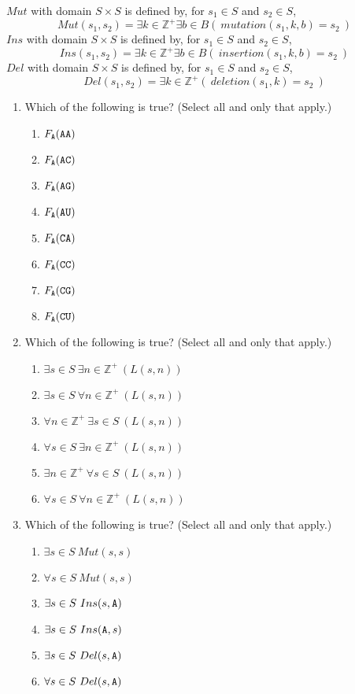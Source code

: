 \documentclass[12pt, oneside]{article}
\begin{document}
\begin{enumerate}
$Mut$ with domain $S \times S$ is defined by, for $s_1 \in S$ and $s_2 \in S$,
\[
Mut(s_1,s_2) = \exists k\in \mathbb{Z^+} \exists b \in B (~ mutation(s_1, k, b) = s_2~)
\]
$Ins$ with domain $S \times S$ is defined by, for $s_1 \in S$ and $s_2 \in S$,
\[
Ins(s_1,s_2) = \exists k\in \mathbb{Z^+} \exists b \in B (~ insertion(s_1, k, b) = s_2~)
\]
$Del$ with domain $S \times S$ is defined by, for $s_1 \in S$ and $s_2 \in S$,
\[
Del(s_1,s_2) = \exists k\in \mathbb{Z^+} (~ deletion(s_1, k) = s_2~)
\]

\begin{enumerate}
\item Which of the following is true? (Select  all and only that apply.)
 \begin{enumerate}
    \item $F_{\texttt{A}} ( \texttt{A}\texttt{A})$
    \item $F_{\texttt{A}} ( \texttt{A}\texttt{C})$
    \item $F_{\texttt{A}} ( \texttt{A}\texttt{G})$
    \item $F_{\texttt{A}} ( \texttt{A}\texttt{U})$
    \item $F_{\texttt{A}} ( \texttt{C}\texttt{A})$
    \item $F_{\texttt{A}} ( \texttt{C}\texttt{C})$
    \item $F_{\texttt{A}} ( \texttt{C}\texttt{G})$
    \item $F_{\texttt{A}} ( \texttt{C}\texttt{U})$
 \end{enumerate}    
\item Which of the following is true? (Select  all and only that apply.)
 \begin{enumerate}
    \item $\exists s \in S ~\exists n \in \mathbb{Z}^+ ~(L(s,n))$
    \item $\exists s \in S ~\forall n \in \mathbb{Z}^+ ~(L(s,n))$
    \item $\forall n \in \mathbb{Z}^+~\exists s \in S ~(L(s,n))$
    \item $\forall s \in S ~\exists n \in \mathbb{Z}^+ ~(L(s,n))$
    \item $\exists n \in \mathbb{Z}^+ ~\forall s \in S ~(L(s,n))$
    \item $\forall s \in S ~\forall n \in \mathbb{Z}^+ ~(L(s,n))$
 \end{enumerate} 
\item Which of the following is true? (Select  all and only that apply.)
 \begin{enumerate}
    \item $\exists s \in S ~Mut(s,s)$
    \item $\forall s \in S ~Mut(s,s)$
    \item $\exists s \in S ~Ins(s,\texttt{A})$
    \item $\exists s \in S ~Ins(\texttt{A},s)$
    \item $\exists s \in S ~Del(s,\texttt{A})$
    \item $\forall s \in S ~Del(s,\texttt{A})$
 \end{enumerate} 
\end{enumerate}

\end{enumerate}
\newpage
\end{document}
